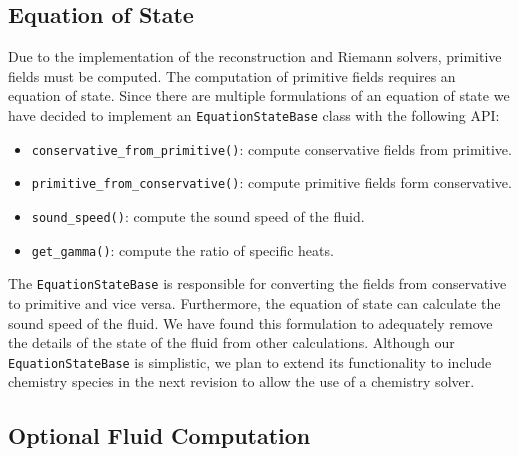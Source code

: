 \subsection{Equation of State}
Due to the implementation of the reconstruction and Riemann solvers, primitive fields
must be computed. The computation of primitive fields requires an equation of state. 
Since there are multiple formulations of an equation of state we have 
decided to implement an \lstinline{EquationStateBase} class with the following API:
\begin{itemize}
    \item \lstinline{conservative_from_primitive()}: compute conservative fields from primitive.
    \item \lstinline{primitive_from_conservative()}: compute primitive fields form conservative.
    \item \lstinline{sound_speed()}: compute the sound speed of the fluid.
    \item \lstinline{get_gamma()}: compute the ratio of specific heats.
\end{itemize}
The \lstinline{EquationStateBase} is responsible for converting the fields from conservative
to primitive and vice versa. Furthermore, the equation of state can calculate the sound
speed of the fluid. We have found this formulation to adequately remove the details of the
state of the fluid from other calculations. Although our \lstinline{EquationStateBase} is simplistic,
we plan to extend its functionality to include chemistry species in the next revision to allow
the use of a chemistry solver.

\subsection{Optional Fluid Computation}
